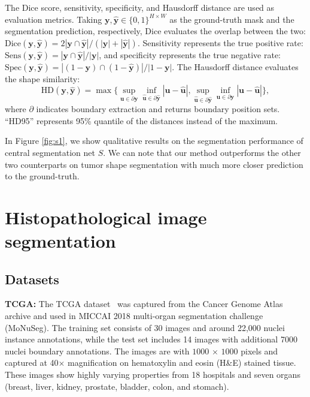 \documentclass[letterpaper]{article} %
\begin{document}
The Dice score, sensitivity, specificity, and Hausdorff distance are used as evaluation metrics. Taking $\bm{y}, \hat{\bm{y}} \in \{0,1 \}^{H \times W}$ as the ground-truth mask and the segmentation prediction, respectively, Dice evaluates the overlap between the two: $\text{Dice}(\bm{y}, \hat{\bm{y}}) = {2|\bm{y} \cap \hat{\bm{y}} |} / {(|\bm{y}|+|\hat{\bm{y}}|)}$. Sensitivity represents the true positive rate: $\text{Sens}(\bm{y}, \hat{\bm{y}}) = {|\bm{y} \cap \hat{\bm{y}} |} / {|\bm{y}|}$, and specificity represents the true negative rate: $\text{Spec}(\bm{y}, \hat{\bm{y}}) = {|(1-\bm{y}) \cap (1-\hat{\bm{y}}) |} / {|1-\bm{y}|}$. The Hausdorff distance evaluates the shape similarity:
\begin{equation}
\label{eq:hausdorff}
    \text{HD}(\bm{y},\hat{\bm{y}}) = \max \{\sup_{\bm{u} \in \partial{\bm{y}}} \inf_{\bm{\hat{u}} \in \partial{\bm{\hat{y}}}}  |\bm{u}-\hat{\bm{u}}|, \sup_{\bm{\hat{u}}\in \partial{\bm{\hat{y}}}} \inf_{\bm{u} \in \partial{\bm{y}}}    |\bm{u}-\hat{\bm{u}}| \},
\end{equation}
where $\partial$ indicates boundary extraction and returns boundary position sets. ``HD95'' represents 95\% quantile of the distances instead of the maximum.

In Figure \ref{fig:s1}, we show qualitative results on the segmentation performance of central segmentation net $S$. We can note that our method outperforms the other two counterparts \cite{mcmahan2017communication, chang2020synthetic} on tumor shape segmentation with much more closer prediction to the ground-truth.


\section{Histopathological image segmentation}
\subsection{Datasets}
\textbf{TCGA:}
The TCGA dataset~\cite{kumar2017dataset}  was captured from the Cancer Genome Atlas  archive and used in MICCAI 2018 multi-organ segmentation challenge (MoNuSeg). The training set consists of 30 images and around 22,000 nuclei instance annotations, while the test set includes 14 images with additional 7000 nuclei boundary annotations. The images are with $1000$ $\times$ $1000$ pixels and captured at 40$\times$  magnification on hematoxylin and eosin (H\&E) stained tissue. These images show highly varying properties from 18 hospitals and seven organs (breast, liver, kidney, prostate, bladder, colon, and stomach).
\end{document}
